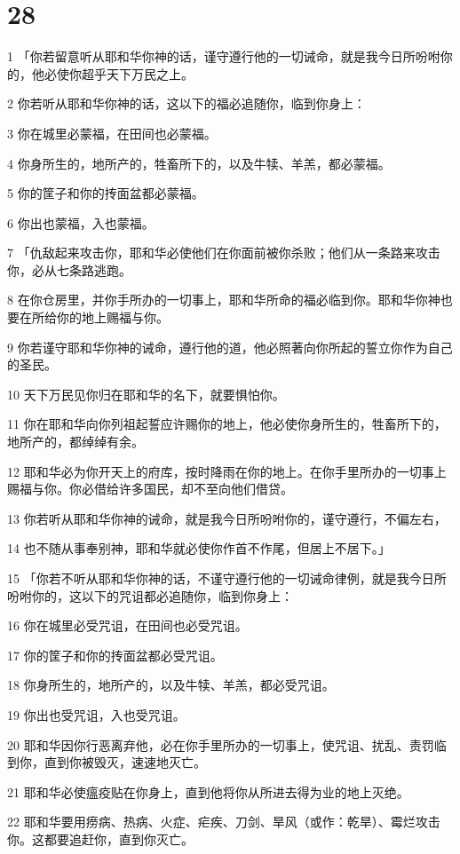 \chapter{28}

\par 1 「你若留意听从耶和华你神的话，谨守遵行他的一切诫命，就是我今日所吩咐你的，他必使你超乎天下万民之上。
\par 2 你若听从耶和华你神的话，这以下的福必追随你，临到你身上：
\par 3 你在城里必蒙福，在田间也必蒙福。
\par 4 你身所生的，地所产的，牲畜所下的，以及牛犊、羊羔，都必蒙福。
\par 5 你的筐子和你的抟面盆都必蒙福。
\par 6 你出也蒙福，入也蒙福。
\par 7 「仇敌起来攻击你，耶和华必使他们在你面前被你杀败；他们从一条路来攻击你，必从七条路逃跑。
\par 8 在你仓房里，并你手所办的一切事上，耶和华所命的福必临到你。耶和华你神也要在所给你的地上赐福与你。
\par 9 你若谨守耶和华你神的诫命，遵行他的道，他必照著向你所起的誓立你作为自己的圣民。
\par 10 天下万民见你归在耶和华的名下，就要惧怕你。
\par 11 你在耶和华向你列祖起誓应许赐你的地上，他必使你身所生的，牲畜所下的，地所产的，都绰绰有余。
\par 12 耶和华必为你开天上的府库，按时降雨在你的地上。在你手里所办的一切事上赐福与你。你必借给许多国民，却不至向他们借贷。
\par 13 你若听从耶和华你神的诫命，就是我今日所吩咐你的，谨守遵行，不偏左右，
\par 14 也不随从事奉别神，耶和华就必使你作首不作尾，但居上不居下。」
\par 15 「你若不听从耶和华你神的话，不谨守遵行他的一切诫命律例，就是我今日所吩咐你的，这以下的咒诅都必追随你，临到你身上：
\par 16 你在城里必受咒诅，在田间也必受咒诅。
\par 17 你的筐子和你的抟面盆都必受咒诅。
\par 18 你身所生的，地所产的，以及牛犊、羊羔，都必受咒诅。
\par 19 你出也受咒诅，入也受咒诅。
\par 20 耶和华因你行恶离弃他，必在你手里所办的一切事上，使咒诅、扰乱、责罚临到你，直到你被毁灭，速速地灭亡。
\par 21 耶和华必使瘟疫贴在你身上，直到他将你从所进去得为业的地上灭绝。
\par 22 耶和华要用痨病、热病、火症、疟疾、刀剑、旱风（或作：乾旱）、霉烂攻击你。这都要追赶你，直到你灭亡。
